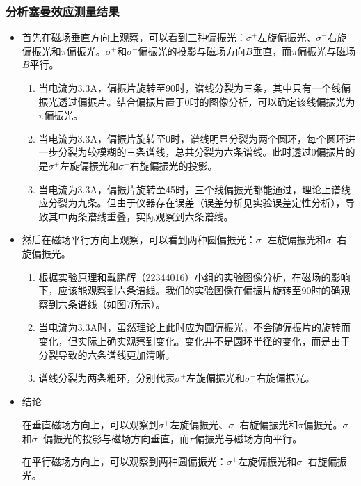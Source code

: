 \documentclass[dvipsnames, svgnames,a4paper,11pt]{article}
\begin{document}
	\subsubsection{分析塞曼效应测量结果}
	\begin{itemize}
		\item 首先在磁场垂直方向上观察，可以看到三种偏振光：$\sigma^+$左旋偏振光、$\sigma^-$右旋偏振光和$\pi$偏振光。$\sigma^+$和$\sigma^-$偏振光的投影与磁场方向$B$垂直，而$\pi$偏振光与磁场$B$平行。
		
		\begin{enumerate}
			\item 当电流为3.3A，偏振片旋转至90\degree 时，谱线分裂为三条，其中只有一个线偏振光透过偏振片。结合偏振片置于0\degree 时的图像分析，可以确定该线偏振光为$\pi$偏振光。
			\item 当电流为3.3A，偏振片旋转至0\degree 时，谱线明显分裂为两个圆环，每个圆环进一步分裂为较模糊的三条谱线，总共分裂为六条谱线。此时透过0\degree 偏振片的是$\sigma^+$左旋偏振光和$\sigma^-$右旋偏振光的投影。
			\item 当电流为3.3A，偏振片旋转至45\degree 时，三个线偏振光都能通过，理论上谱线应分裂为九条。但由于仪器存在误差（误差分析见实验误差定性分析），导致其中两条谱线重叠，实际观察到六条谱线。
		\end{enumerate}
		
		\item 然后在磁场平行方向上观察，可以看到两种圆偏振光：$\sigma^+$左旋偏振光和$\sigma^-$右旋偏振光。
		
		\begin{enumerate}
			\item 根据实验原理和戴鹏辉（22344016）小组的实验图像分析，在磁场的影响下，应该能观察到六条谱线。我们的实验图像在偏振片旋转至90\degree 时的确观察到六条谱线（如图7所示）。
			\item 当电流为3.3A时，虽然理论上此时应为圆偏振光，不会随偏振片的旋转而变化，但实际上确实观察到变化。变化并不是圆环半径的变化，而是由于分裂导致的六条谱线更加清晰。
			\item 谱线分裂为两条粗环，分别代表$\sigma^+$左旋偏振光和$\sigma^-$右旋偏振光。
		\end{enumerate}
		
		\item 结论
		
		在垂直磁场方向上，可以观察到$\sigma^+$左旋偏振光、$\sigma^-$右旋偏振光和$\pi$偏振光。$\sigma^+$和$\sigma^-$偏振光的投影与磁场方向垂直，而$\pi$偏振光与磁场方向平行。
		
		在平行磁场方向上，可以观察到两种圆偏振光：$\sigma^+$左旋偏振光和$\sigma^-$右旋偏振光。
		

\end{itemize}
\end{document}
